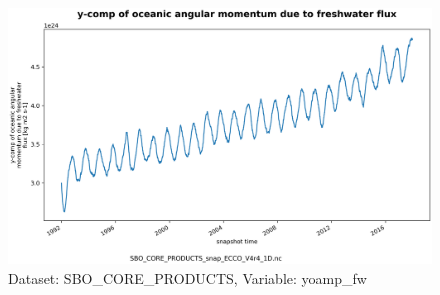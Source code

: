 \begin{figure}[H]
\centering
\includegraphics[scale=0.55]{../images/plots/oneD_plots/SBO_Core_Products/yoamp_fw.png}
\caption{Dataset: SBO\_CORE\_PRODUCTS, Variable: yoamp\_fw}
\label{tab:table-SBO_CORE_PRODUCTS_yoamp_fw-Plot}
\end{figure}
\newpage
\pagebreak
